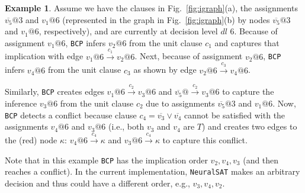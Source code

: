 \documentclass[oneside,11pt,dvipsnames]{book}
\numberwithin{equation}{section}
\theoremstyle{definition}
\newtheorem{example}{Example}[section]
\theoremstyle{remark}
\newcommand{\tvn}[1]{\iftoggle{usecomment}{{\color{red}{[TVN]: #1}}}{}}
\newcommand{\tool}{\texttt{NeuralSAT}}
\begin{document}
\begin{example}
    Assume we have the clauses in Fig.~\ref{fig:igraph}(a), the assignments $\overline{v_5}@3$ and $v_1@6$ (represented in the graph in Fig.~\ref{fig:igraph}(b) by nodes  $\overline{v_5}@3$ and $v_1@6$, respectively), and are currently at decision level $dl$ 6.
Because of assignment $v_1@6$, \texttt{BCP} infers $v_2@6$ from the unit clause $c_1$ and captures that implication with edge $v_1@6 \xrightarrow{c_1} v_2@6$.
Next, because of assignment $v_2@6$, \texttt{BCP} infers $v_4@6$ from the unit clause $c_3$ as shown by edge $v_2@6 \xrightarrow{c_3} v_4@6$.

Similarly, \texttt{BCP} creates edges $v_1@6 \xrightarrow{c_2} v_3@6$ and $\overline{v_5}@ \xrightarrow{c_2} v_3@6$ to capture  the inference $v_3@6$ from the unit clause $c_2$ due to assignments $\overline{v_5}@3$ and $v_1@6$.
Now, \texttt{BCP} detects a conflict because clause $c_4=\overline{v_3} \lor \overline{v_4}$ cannot be satisfied with the assignments $v_4@6$ and $v_3@6$ (i.e., both $v_3$ and $v_4$ are $T$)  and creates two edges to the (red) node $\kappa$: $v_4@6 \xrightarrow{c_4} \kappa$ and $v_3@6 \xrightarrow{c_4} \kappa$ to capture this conflict.

Note that in this example \texttt{BCP} has the implication order $v_2,v_4,v_3$ (and then reaches a conflict). In the current implementation, \tool{} makes an arbitrary decision and thus could have a different order, e.g., $v_3, v_4,v_2$.
\end{example}




\end{document}
